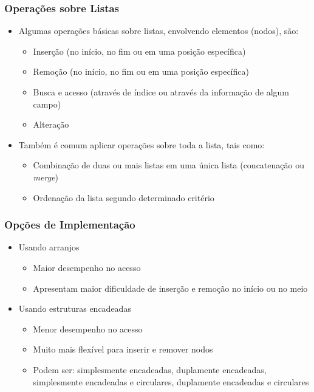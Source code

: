 \documentclass[aspectratio=169]{beamer}
\begin{document}
\begin{frame}\frametitle{Operações sobre Listas}
\begin{itemize}
	\item Algumas operações básicas sobre listas, envolvendo elementos (nodos), são:
	\begin{itemize}
		\item Inserção (no início, no fim ou em uma posição específica)
		\item Remoção (no início, no fim ou em uma posição específica)
		\item Busca e acesso (através de índice ou através da informação de algum campo)
		\item Alteração
	\end{itemize}
	\item Também é comum aplicar operações sobre toda a lista, tais como:	
	\begin{itemize}
		\item Combinação de duas ou mais listas em uma única lista (concatenação ou \emph{merge})
		\item Ordenação da lista segundo determinado critério
	\end{itemize}
\end{itemize}
\end{frame}

\begin{frame}\frametitle{Opções de Implementação}
\begin{itemize}
	\item Usando arranjos
	\begin{itemize}
		\item Maior desempenho no acesso
		\item Apresentam maior dificuldade de inserção e remoção no início ou no meio
	\end{itemize}
	\item Usando estruturas encadeadas
	\begin{itemize}
		\item Menor desempenho no acesso
		\item Muito mais flexível para inserir e remover nodos
		\item Podem ser: simplesmente encadeadas, duplamente encadeadas, simplesmente encadeadas e circulares, duplamente encadeadas e circulares
	\end{itemize}
\end{itemize}
\end{frame}
\end{document}
